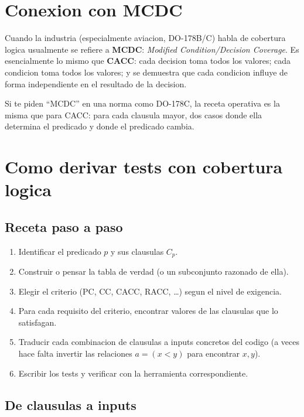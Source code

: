 \documentclass[12pt,a4paper]{article}
\begin{document}
\section{Conexion con MCDC}

Cuando la industria (especialmente aviacion, DO-178B/C) habla de cobertura logica usualmente se
refiere a \textbf{MCDC}: \emph{Modified Condition/Decision Coverage}. Es esencialmente lo mismo
que \textbf{CACC}: cada decision toma todos los valores; cada condicion toma todos los valores;
y se demuestra que cada condicion influye de forma independiente en el resultado de la decision.

\begin{ideabox}
Si te piden ``MCDC'' en una norma como DO-178C, la receta operativa es la misma que para CACC:
para cada clausula mayor, dos casos donde ella determina el predicado y donde el predicado
cambia.
\end{ideabox}

\section{Como derivar tests con cobertura logica}

\subsection{Receta paso a paso}

\begin{enumerate}
  \item Identificar el predicado $p$ y sus clausulas $C_p$.
  \item Construir o pensar la tabla de verdad (o un subconjunto razonado de ella).
  \item Elegir el criterio (PC, CC, CACC, RACC, \ldots) segun el nivel de exigencia.
  \item Para cada requisito del criterio, encontrar valores de las clausulas que lo satisfagan.
  \item Traducir cada combinacion de clausulas a inputs concretos del codigo (a veces hace falta
  invertir las relaciones $a = (x < y)$ para encontrar $x,y$).
  \item Escribir los tests y verificar con la herramienta correspondiente.
\end{enumerate}

\subsection{De clausulas a inputs}
\end{document}
